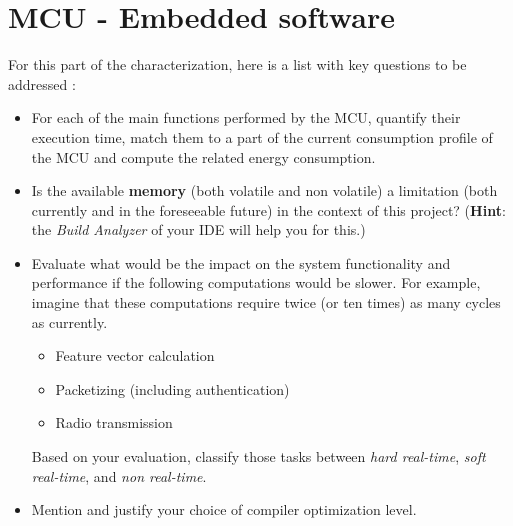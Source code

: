 \section{MCU - Embedded software}
For this part of the characterization, here is a list with key questions to be addressed :
\begin{itemize}
    \item For each of the main functions performed by the MCU, quantify their
        execution time, match them to a part of the current consumption profile
        of the MCU and compute the related energy consumption.
    \item Is the available \textbf{memory} (both volatile and non volatile) a
        limitation (both currently and in the foreseeable future) in the context of
        this project? (\textbf{Hint}: the \textit{Build Analyzer} of your IDE will help you for this.)
    \item Evaluate what would be the impact on the system functionality and
        performance if the following computations would be slower.
        For example, imagine that these computations require twice (or ten times)
        as many cycles as currently.
        \begin{itemize}
            \item Feature vector calculation
            \item Packetizing (including authentication)
            \item Radio transmission
        \end{itemize}
        Based on your evaluation, classify those tasks between \emph{hard
        real-time}, \emph{soft real-time}, and \emph{non real-time}.
    \item Mention and justify your choice of compiler optimization level.
\end{itemize}
